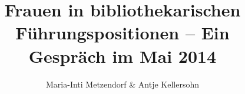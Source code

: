 
\fancyhead[R]{\thepage} %

\title{\LARGE{Frauen in bibliothekarischen Führungspositionen – Ein Gespräch im Mai 2014}} %
\author{Maria-Inti Metzendorf \& Antje Kellersohn} %

